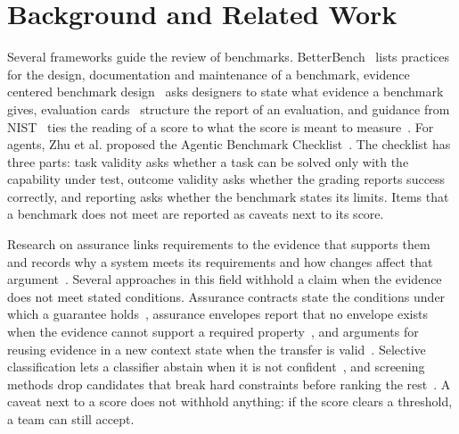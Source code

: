 \documentclass[runningheads]{llncs}
\begin{document}
\section{Background and Related Work}
\label{sec:related}
Several frameworks guide the review of benchmarks. BetterBench~\cite{reuel_betterbench} lists practices for the design, documentation and maintenance of a benchmark, evidence centered benchmark design~\cite{liu_ecbd_2024} asks designers to state what evidence a benchmark gives, evaluation cards~\cite{ghosh_evaluation_cards_2026} structure the report of an evaluation, and guidance from NIST~\cite{nist_ai_800_2_2026} ties the reading of a score to what the score is meant to measure~\cite{kane_validation}. For agents, Zhu et al. proposed the Agentic Benchmark Checklist~\cite{zhu_agentic_benchmark_checklist_2025}. The checklist has three parts: task validity asks whether a task can be solved only with the capability under test, outcome validity asks whether the grading reports success correctly, and reporting asks whether the benchmark states its limits. Items that a benchmark does not meet are reported as caveats next to its score.

Research on assurance links requirements to the evidence that supports them~\cite{gotel_traceability_1994,arief_vnvspec_2026} and records why a system meets its requirements and how changes affect that argument~\cite{hawkins_amlas_2021,lawford_safety_case_impact_2017}. Several approaches in this field withhold a claim when the evidence does not meet stated conditions. Assurance contracts state the conditions under which a guarantee holds~\cite{sljivo_assurance_contracts_2014}, assurance envelopes report that no envelope exists when the evidence cannot support a required property~\cite{goswami_assurance_envelopes_2026}, and arguments for reusing evidence in a new context state when the transfer is valid~\cite{picardi_transfer_assurance_2023,mukhopadhyay_nalla_evidence_reuse_2026}. Selective classification lets a classifier abstain when it is not confident~\cite{el_yaniv_selective_classification_2010}, and screening methods drop candidates that break hard constraints before ranking the rest~\cite{singh_damsa_sms_2026}. A caveat next to a score does not withhold anything: if the score clears a threshold, a team can still accept.
\end{document}
